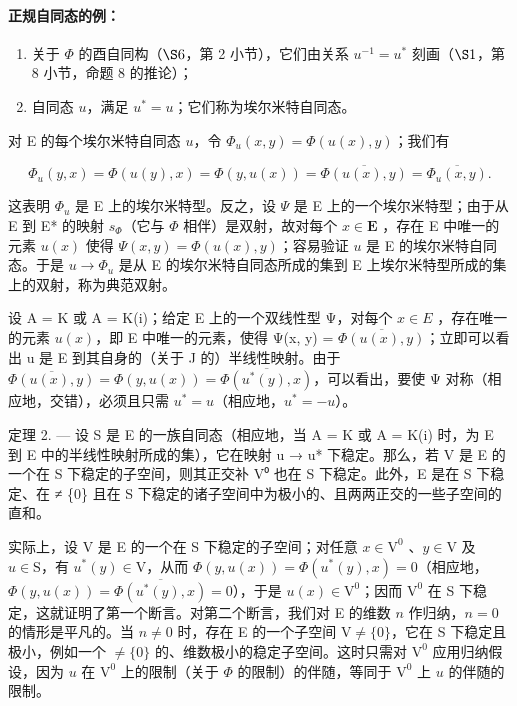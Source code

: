 \paragraph{正规自同态的例：}

\begin{enumerate}
\def\labelenumi{\arabic{enumi})}
\item
  关于 \(\Phi\) 的酉自同构（\(\S 6\)，第 2 小节），它们由关系 \(u^{-1} = u^{*}\) 刻画（\(\S 1\)，第 8 小节，命题 8 的推论）；
\item
  自同态 \(u\)，满足 \(u^{*}=u\)；它们称为埃尔米特自同态。
\end{enumerate}

对 E 的每个埃尔米特自同态 \(u\)，令 \(\Phi_{u}(x,y)=\Phi(u(x),y)\)；我们有

\[
\Phi_ {u} (y, x) = \Phi (u (y), x) = \Phi (y, u (x)) = \overline {{\Phi (u (x) , y)}} = \overline {{\Phi_ {u} (x , y)}}.
\]

这表明 \(\Phi_{u}\) 是 E 上的埃尔米特型。反之，设 \(\Psi\) 是 E 上的一个埃尔米特型；由于从 E 到 E* 的映射 \(s_{\Phi}\)（它与 \(\Phi\) 相伴）是双射，故对每个 \(x \in \mathbf{E}\) ，存在 E 中唯一的元素 \(u(x)\) 使得 \(\Psi(x, y) = \Phi(u(x), y)\)；容易验证 \(u\) 是 E 的埃尔米特自同态。于是 \(u \to \Phi_{u}\) 是从 E 的埃尔米特自同态所成的集到 E 上埃尔米特型所成的集上的双射，称为典范双射。

设 A = K 或 A = K(i)；给定 E 上的一个双线性型 Ψ，对每个 \(x \in E\) ，存在唯一的元素 \(u(x)\)，即 E 中唯一的元素，使得 Ψ(x, y) = \(\overline{\Phi(u(x), y)}\)；立即可以看出 u 是 E 到其自身的（关于 J 的）半线性映射。由于 \(\overline{\Phi(u(x), y)} = \Phi(y, u(x)) = \overline{\Phi(u^{*}(y), x)}\)，可以看出，要使 Ψ 对称（相应地，交错），必须且只需 \(u^{*} = u\)（相应地，\(u^{*} = -u\)）。

定理 2. --- 设 S 是 E 的一族自同态（相应地，当 A = K 或 A = K(i) 时，为 E 到 E 中的半线性映射所成的集），它在映射 u → u* 下稳定。那么，若 V 是 E 的一个在 S 下稳定的子空间，则其正交补 V⁰ 也在 S 下稳定。此外，E 是在 S 下稳定、在 ≠ \{0\} 且在 S 下稳定的诸子空间中为极小的、且两两正交的一些子空间的直和。

实际上，设 V 是 E 的一个在 S 下稳定的子空间；对任意 \(x \in \mathrm{V}^0\) 、\(y \in \mathrm{V}\) 及 \(u \in \mathrm{S}\)，有 \(u^*(y) \in \mathrm{V}\)，从而 \(\Phi(y, u(x)) = \Phi(u^*(y), x) = 0\)（相应地，\(\Phi(y, u(x)) = \overline{\Phi(u^*(y), x)} = 0\)），于是 \(u(x) \in \mathrm{V}^0\)；因而 \(\mathrm{V}^0\) 在 S 下稳定，这就证明了第一个断言。对第二个断言，我们对 E 的维数 \(n\) 作归纳，\(n = 0\) 的情形是平凡的。当 \(n \neq 0\) 时，存在 E 的一个子空间 \(\mathrm{V} \neq \{0\}\)，它在 S 下稳定且极小，例如一个 \(\neq \{0\}\) 的、维数极小的稳定子空间。这时只需对 \(\mathrm{V}^0\) 应用归纳假设，因为 \(u\) 在 \(\mathrm{V}^0\) 上的限制（关于 \(\Phi\) 的限制）的伴随，等同于 \(\mathrm{V}^0\) 上 \(u\) 的伴随的限制。

